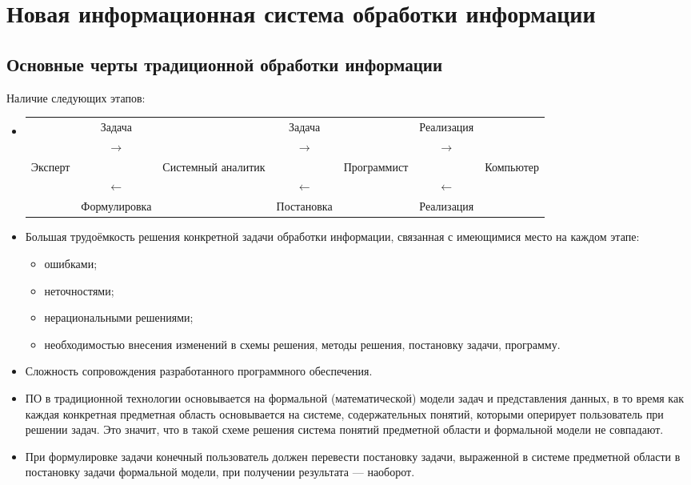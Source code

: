 \documentclass[a4paper,12pt]{report}
\begin{document}
\section{Новая информационная система обработки информации}


\subsection{Основные черты традиционной обработки информации}

	Наличие следующих этапов:
	\begin{itemize}
		\item
			\begin{tabular}{ p{2cm} | c | p{2cm} | c | p{2.4cm} | c | p{2cm} }
				& Задача        & & Задача        & & Реализация    & \\
				& $\rightarrow$ & & $\rightarrow$ & & $\rightarrow$ & \\
				\hline
				Эксперт & & Системный аналитик & & Программист & & Компьютер \\
				\hline
				& $\leftarrow$ & & $\leftarrow$ & & $\leftarrow$ & \\
				& Формулировка & & Постановка   & & Реализация   & \\
			\end{tabular}
		\item Большая трудоёмкость решения конкретной задачи обработки информации,
			связанная с имеющимися место на каждом этапе:
			\begin{itemize}
				\item ошибками;
				\item неточностями;
				\item нерациональными решениями;
				\item необходимостью внесения изменений в схемы решения,
					методы решения, постановку задачи, программу.
			\end{itemize}
		\item Сложность сопровождения разработанного программного обеспечения.
		\item ПО в традиционной технологии основывается на формальной
			(математической) модели задач и представления данных, в то время как
			каждая конкретная предметная область основывается на системе,
			содержательных понятий, которыми оперирует пользователь при решении
			задач. Это значит, что в такой схеме решения система понятий предметной
			области и формальной модели не совпадают.
		\item При формулировке задачи конечный пользователь должен перевести
			постановку задачи, выраженной в системе предметной области в постановку
			задачи формальной модели, при получении результата — наоборот.
	\end{itemize}
\end{document}
